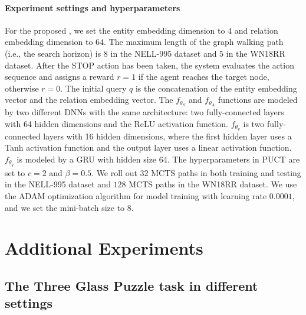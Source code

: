 \paragraph{Experiment settings and hyperparameters}
For the proposed \modelname, we set the entity embedding dimension to $4$ and relation embedding dimension to $64$.
The maximum length of the graph walking path (i.e., the search horizon) is $8$ in the NELL-995 dataset and $5$ in the WN18RR dataset.
After the STOP action has been taken, the system evaluates the action sequence and assigns a reward $r = 1$ if the agent reaches the target node, otherwise  $r = 0$.
The initial query $q$ is the concatenation of the entity embedding vector and the relation embedding vector. 
The $f_{{\theta}_{S}}$ and $f_{{\theta}_{A}}$ functions are modeled by two different DNNs with the same architecture: two fully-connected layers with 64 hidden dimensions and the ReLU activation function.
$f_{{\theta}_{v}}$ is two fully-connected layers with 16 hidden dimensions, where the first hidden layer uses a Tanh activation function and the output layer uses a linear activation function. 
$f_{{\theta}_{q}}$ is modeled by a GRU with hidden size 64.
The hyperparameters in PUCT are set to $c=2$ and $\beta=0.5$. 
We roll out $32$ MCTS paths in both training and testing in the NELL-995 dataset and $128$ MCTS paths in the WN18RR dataset.
We use the ADAM optimization algorithm for model training with learning rate $0.0001$, and we set the mini-batch size to $8$.






\section{Additional Experiments}
\label{Appendix:AdditionalExperiments}
\subsection{The Three Glass Puzzle task in different settings}
\label{Appendix:MCTSTesting}


